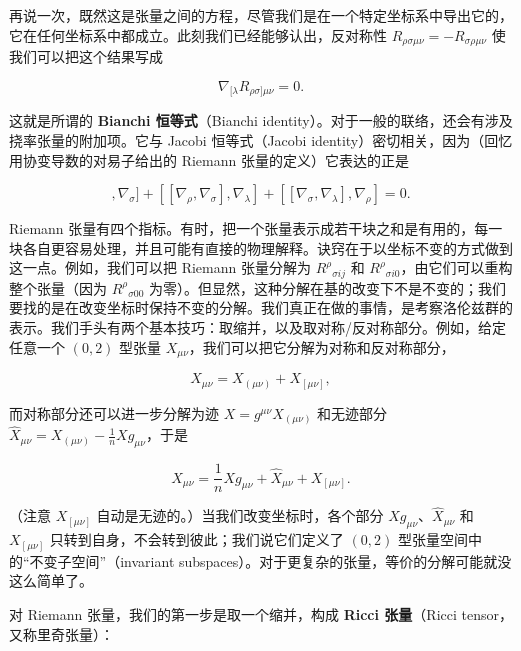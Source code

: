再说一次，既然这是张量之间的方程，尽管我们是在一个特定坐标系中导出它的，它在任何坐标系中都成立。此刻我们已经能够认出，反对称性 $R_{\rho\sigma\mu\nu} = -R_{\sigma\rho\mu\nu}$ 使我们可以把这个结果写成

\begin{equation*}
\nabla_{[\lambda}R_{\rho\sigma]\mu\nu} = 0. \tag{3.140}
\end{equation*}

这就是所谓的 \textbf{Bianchi 恒等式}（Bianchi identity）。对于一般的联络，还会有涉及挠率张量的附加项。它与 Jacobi 恒等式（Jacobi identity）密切相关，因为（回忆用协变导数的对易子给出的 Riemann 张量的定义）它表达的正是

\begin{equation*}
[[\nabla_\lambda, \nabla_\rho], \nabla_\sigma] + [[\nabla_\rho, \nabla_\sigma], \nabla_\lambda] + [[\nabla_\sigma, \nabla_\lambda], \nabla_\rho] = 0. \tag{3.141}
\end{equation*}

Riemann 张量有四个指标。有时，把一个张量表示成若干块之和是有用的，每一块各自更容易处理，并且可能有直接的物理解释。诀窍在于以坐标不变的方式做到这一点。例如，我们可以把 Riemann 张量分解为 $R^\rho{}_{\sigma ij}$ 和 $R^\rho{}_{\sigma i0}$，由它们可以重构整个张量（因为 $R^\rho{}_{\sigma 00}$ 为零）。但显然，这种分解在基的改变下不是不变的；我们要找的是在改变坐标时保持不变的分解。我们真正在做的事情，是考察洛伦兹群的表示。我们手头有两个基本技巧：取缩并，以及取对称/反对称部分。例如，给定任意一个 $(0,2)$ 型张量 $X_{\mu\nu}$，我们可以把它分解为对称和反对称部分，

\begin{equation*}
X_{\mu\nu} = X_{(\mu\nu)} + X_{[\mu\nu]}, \tag{3.142}
\end{equation*}

而对称部分还可以进一步分解为迹 $X = g^{\mu\nu}X_{(\mu\nu)}$ 和无迹部分 $\widehat X_{\mu\nu} = X_{(\mu\nu)} - \frac{1}{n}Xg_{\mu\nu}$，于是

\begin{equation*}
X_{\mu\nu} = \frac{1}{n}Xg_{\mu\nu} + \widehat X_{\mu\nu} + X_{[\mu\nu]}. \tag{3.143}
\end{equation*}

（注意 $X_{[\mu\nu]}$ 自动是无迹的。）当我们改变坐标时，各个部分 $Xg_{\mu\nu}$、$\widehat X_{\mu\nu}$ 和 $X_{[\mu\nu]}$ 只转到自身，不会转到彼此；我们说它们定义了 $(0,2)$ 型张量空间中的“不变子空间”（invariant subspaces）。对于更复杂的张量，等价的分解可能就没这么简单了。

对 Riemann 张量，我们的第一步是取一个缩并，构成 \textbf{Ricci 张量}（Ricci tensor，又称里奇张量）：

